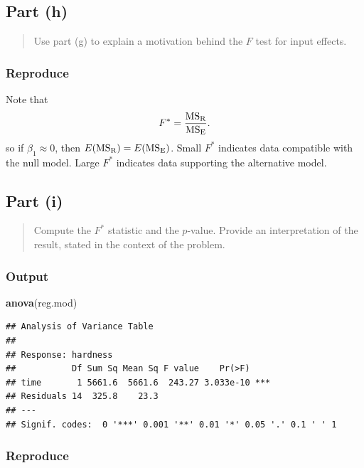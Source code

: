 \documentclass[
]{article}
\newenvironment{Shaded}{\begin{snugshade}}{\end{snugshade}}
\newcommand{\FunctionTok}[1]{\textcolor[rgb]{0.13,0.29,0.53}{\textbf{#1}}}
\newcommand{\NormalTok}[1]{#1}
\begin{document}
\hypertarget{part-h}{%
\subsection{Part (h)}\label{part-h}}

\begin{quote}
Use part (g) to explain a motivation behind the \(F\) test for input
effects.
\end{quote}

\hypertarget{reproduce-5}{%
\subsubsection{Reproduce}\label{reproduce-5}}

Note that \[
  F^* = \frac{\mathrm{MS_{R}}}{\mathrm{MS_{E}}}.
\] so if \(\beta_1 \approx 0\), then \(E(\mathrm{MS_{R}}) = E(\mathrm{MS_{E}})\). Small
\(F^*\) indicates data compatible with the null model. Large \(F^*\)
indicates data supporting the alternative model.

\hypertarget{part-i}{%
\subsection{Part (i)}\label{part-i}}

\begin{quote}
Compute the \(F^*\) statistic and the \(p\)-value. Provide an
interpretation of the result, stated in the context of the problem.
\end{quote}

\hypertarget{output-3}{%
\subsubsection{Output}\label{output-3}}

\begin{Shaded}
\begin{Highlighting}[]
\FunctionTok{anova}\NormalTok{(reg.mod)}
\end{Highlighting}
\end{Shaded}

\begin{verbatim}
## Analysis of Variance Table
## 
## Response: hardness
##           Df Sum Sq Mean Sq F value    Pr(>F)    
## time       1 5661.6  5661.6  243.27 3.033e-10 ***
## Residuals 14  325.8    23.3                      
## ---
## Signif. codes:  0 '***' 0.001 '**' 0.01 '*' 0.05 '.' 0.1 ' ' 1
\end{verbatim}

\hypertarget{reproduce-6}{%
\subsubsection{Reproduce}\label{reproduce-6}}
\end{document}
